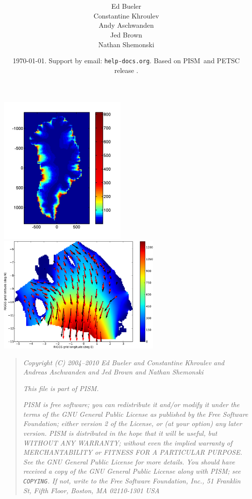 \documentclass[11pt,final]{amsart}
\title[PISM User's Manual]{\protect{\Large \emph{PISM}, a Parallel Ice Sheet Model:\normalsize} \\ \protect{\Large \bigskip \bigskip User's Manual\normalsize}}
\author[]{Ed Bueler \\ Constantine Khroulev \\ Andy Aschwanden \\ Jed Brown \\ Nathan Shemonski}
\date{\today.  Support by email: \texttt{help\@@pism-docs.org}.  Based on PISM \PISMREV\,and PETSC release \PETSCREL. \PISMDOWNLOADMSG}
\newcommand{\normalspacing}{\renewcommand{\baselinestretch}{1.1}\tiny\normalsize}
\begin{document}
\graphicspath{{figs/}}

\maketitle
\thispagestyle{empty}

\vspace{2.0in}
\begin{center}
\includegraphics[width=2.5in,keepaspectratio=true]{greencbar_SSL2}\, \includegraphics[width=3.2in,keepaspectratio=true]{rossquiver}
\end{center}

\newpage
\phantom{bob}
\vspace{1.0in}
\begin{quote}
\textsl{Copyright (C) 2004--2010 Ed Bueler and Constantine Khroulev and Andreas Aschwanden and Jed Brown and Nathan Shemonski}
\medskip

\noindent \textsl{This file is part of PISM.}
\medskip

\noindent \textsl{PISM is free software; you can redistribute it and/or modify it under the terms of the GNU General Public License as published by the Free Software Foundation; either version 2 of the License, or (at your option) any later version.  PISM is distributed in the hope that it will be useful, but WITHOUT ANY WARRANTY; without even the implied warranty of MERCHANTABILITY or FITNESS FOR A PARTICULAR PURPOSE.  See the GNU General Public License for more details.  You should have received a copy of the GNU General Public License along with PISM; see \emph{\texttt{COPYING}}.  If not, write to the Free Software Foundation, Inc., 51 Franklin St, Fifth Floor, Boston, MA  02110-1301 USA}
\end{quote}
\vspace{0.6in}
\normalspacing
\end{document}
